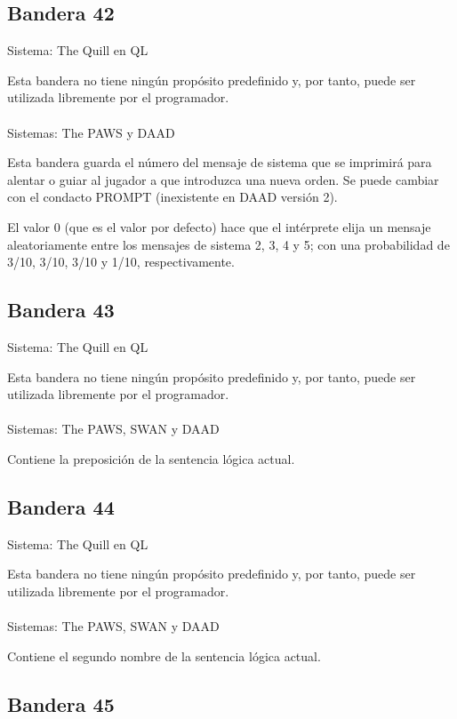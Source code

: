 \documentclass[11pt, a5paper]{article}
\newcommand{\quill}{\textsf{The Quill}\xspace}
\newcommand{\paw}{\textsf{The PAWS}\xspace}
\newcommand{\swan}{\textsf{SWAN}\xspace}
\newcommand{\daad}{\textsf{DAAD}\xspace}
\newcommand{\sistema}[1]{\noindent Sistema: #1 \nopagebreak}
\newcommand{\sistemas}[1]{\noindent Sistemas: #1 \nopagebreak}
\begin{document}
\subsection{Bandera 42}

\sistema{\quill en QL}

Esta bandera no tiene ningún propósito predefinido y, por tanto, puede ser utilizada libremente por el programador.
\\\ \\
\sistemas{\paw y \daad}

Esta bandera guarda el número del mensaje de sistema que se imprimirá para alentar o guiar al jugador a que introduzca una nueva orden. Se puede cambiar con el condacto PROMPT (inexistente en \daad versión 2).

El valor 0 (que es el valor por defecto) hace que el intérprete elija un mensaje aleatoriamente entre los mensajes de sistema 2, 3, 4 y 5; con una probabilidad de 3/10, 3/10, 3/10 y 1/10, respectivamente.

\subsection{Bandera 43}

\sistema{\quill en QL}

Esta bandera no tiene ningún propósito predefinido y, por tanto, puede ser utilizada libremente por el programador.
\\\ \\
\sistemas{\paw, \swan y \daad}

Contiene la preposición de la sentencia lógica actual.

\subsection{Bandera 44}

\sistema{\quill en QL}

Esta bandera no tiene ningún propósito predefinido y, por tanto, puede ser utilizada libremente por el programador.
\\\ \\
\sistemas{\paw, \swan y \daad}

Contiene el segundo nombre de la sentencia lógica actual.

\subsection{Bandera 45}
\end{document}
